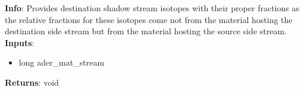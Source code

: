 \textbf{Info}: Provides destination shadow stream isotopes with their proper
fractions as the relative fractions for these isotopes come not from the
material hosting the destination side stream but from the material hosting
the source side stream. \\

\noindent \textbf{Inputs}:
\begin{itemize}
\item{long ader\_mat\_stream}
\end{itemize}

\noindent \textbf{Returns}: void
